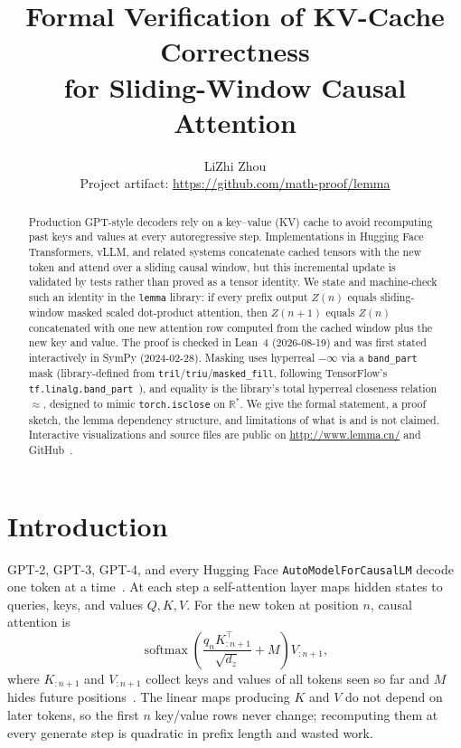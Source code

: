 \documentclass[11pt,a4paper]{article}
\title{Formal Verification of KV-Cache Correctness\\for Sliding-Window Causal Attention}
\author{LiZhi Zhou\\[0.3em]\small Project artifact: \url{https://github.com/math-proof/lemma}}
\date{}
\newcommand{\XEq}{\approx}
\newcommand{\Rstar}{\mathbb{R}^*}
\begin{document}
\maketitle

\begin{abstract}
Production GPT-style decoders rely on a key--value (KV) cache to avoid recomputing past keys and values at every autoregressive step.
Implementations in Hugging Face Transformers, vLLM, and related systems concatenate cached tensors with the new token and attend over a sliding causal window, but this incremental update is validated by tests rather than proved as a tensor identity.
We state and machine-check such an identity in the \texttt{lemma} library: if every prefix output $Z(n)$ equals sliding-window masked scaled dot-product attention, then $Z(n{+}1)$ equals $Z(n)$ concatenated with one new attention row computed from the cached window plus the new key and value.
The proof is checked in Lean~4 (2026-08-19) and was first stated interactively in SymPy (2024-02-28).
Masking uses hyperreal $-\infty$ via a \texttt{band\_part} mask (library-defined from \texttt{tril}/\texttt{triu}/\texttt{masked\_fill}, following TensorFlow's \texttt{tf.linalg.band\_part}~\cite{tensorflow_band_part}), and equality is the library's total hyperreal closeness relation $\XEq$, designed to mimic \texttt{torch.isclose} on $\Rstar$.
We give the formal statement, a proof sketch, the lemma dependency structure, and limitations of what is and is not claimed.
Interactive visualizations and source files are public on \url{http://www.lemma.cn/} and GitHub~\cite{lemma_repo}.
\end{abstract}

\section{Introduction}
\label{sec:intro}

GPT-2, GPT-3, GPT-4, and every Hugging Face \texttt{AutoModelForCausalLM} decode one token at a time~\cite{radford2019language}.
At each step a self-attention layer maps hidden states to queries, keys, and values $Q,K,V$.
For the new token at position $n$, causal attention is
\[
\operatorname{softmax}\!\left(\frac{q_n K_{:n+1}^{\top}}{\sqrt{d_z}}+M\right)V_{:n+1},
\]
where $K_{:n+1}$ and $V_{:n+1}$ collect keys and values of all tokens seen so far and $M$ hides future positions~\cite{vaswani2017attention}.
The linear maps producing $K$ and $V$ do not depend on later tokens, so the first $n$ key/value rows never change; recomputing them at every generate step is quadratic in prefix length and wasted work.
\end{document}
